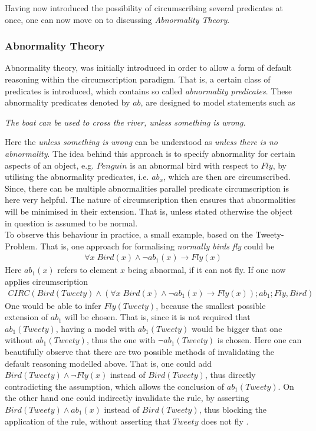 \documentclass{article}
\begin{document}
Having now introduced the possibility of circumscribing several predicates at once, one can now move on to discussing \emph{Abnormality Theory}.

\subsubsection*{Abnormality Theory}
Abnormality theory, was initially introduced in order to allow a form of default reasoning within the circumscription paradigm. That is, a certain class of predicates is introduced, which contains so called \emph{abnormality predicates}. These abnormality predicates denoted by $ab$, are designed to model statements such as 
\begin{center}
\emph{The boat can be used to cross the river, unless something is wrong.}
\end{center}
Here the \emph{unless something is wrong} can be understood as \emph{unless there is no abnormality}. The idea behind this approach is to specify abnormality for certain aspects of an object, e.g. $Penguin$ is an abnormal bird with respect to $Fly$, by utilising the abnormality predicates, i.e. $ab_x$, which are then are circumscribed. Since, there can be multiple abnormalities parallel predicate circumscription is here very helpful. The nature of circumscription then ensures that abnormalities will be minimised in their extension. That is, unless stated otherwise the object in question is assumed to be normal.  \cite{BOCHMAN2007557,brewka1997nonmonotonic} \\
To observe this behaviour in practice, a small example, based on the Tweety-Problem. That is, one approach for formalising \emph{normally birds fly} could be 
\begin{equation*}
\begin{split}
\forall x\; Bird(x) \wedge \neg ab_1(x) \to Fly(x)
\end{split}
\end{equation*}
Here $ab_1(x)$ refers to element $x$ being abnormal, if it can not fly.
If one now applies circumscription 
\begin{equation*}
\begin{split}
CIRC(Bird(Tweety) \wedge (\forall x\; Bird(x) \wedge \neg ab_1(x) \to Fly(x));ab_1;Fly,Bird)
\end{split}
\end{equation*}
One would be able to infer $Fly(Tweety)$, because the smallest possible extension of $ab_1$ will be chosen. That is, since it is not required that $ab_1(Tweety)$, having a model with $ab_1(Tweety)$ would be bigger that one without $ab_1(Tweety)$, thus the one with $\neg ab_1(Tweety)$ is chosen. Here one can beautifully observe that there are two possible methods of invalidating the default reasoning modelled above. 
That is, one could add $Bird(Tweety) \wedge \neg Fly(x)$ instead of $Bird(Tweety)$, thus directly contradicting the assumption, which allows the conclusion of $ab_1(Tweety)$.
On the other hand one could indirectly invalidate the rule, by asserting $Bird(Tweety) \wedge ab_1(x)$ instead of $Bird(Tweety)$, thus blocking the application of the rule, without asserting that $Tweety$ does not fly \cite{brewka1997nonmonotonic}. 
\end{document}
